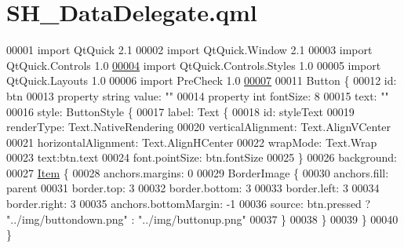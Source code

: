 \hypertarget{SH__DataDelegate_8qml}{\section{S\-H\-\_\-\-Data\-Delegate.\-qml}
\label{SH__DataDelegate_8qml}
}

\begin{DoxyCode}
00001 \textcolor{keyword}{import} QtQuick 2.1
00002 import QtQuick.Window 2.1
00003 import QtQuick.Controls 1.0
\hypertarget{SH__DataDelegate_8qml_source_l00004}{}\hyperlink{classSH__DataDelegate}{00004} import QtQuick.Controls.Styles 1.0
00005 import QtQuick.Layouts 1.0
00006 import PreCheck 1.0
\hypertarget{SH__DataDelegate_8qml_source_l00007}{}\hyperlink{classSH__DataDelegate_acb9da3c73493c88865e08d9575f26482}{00007} 
00011 Button \{
00012     \textcolor{keywordtype}{id}: btn
00013     \textcolor{keyword}{property} \textcolor{keywordtype}{string} value: \textcolor{stringliteral}{""}
00014     \textcolor{keyword}{property} \textcolor{keywordtype}{int} fontSize: 8
00015     text: \textcolor{stringliteral}{""}
00016     style: ButtonStyle \{
00017         label: Text \{
00018             \textcolor{keywordtype}{id}: styleText
00019             renderType: Text.NativeRendering
00020             verticalAlignment: Text.AlignVCenter
00021             horizontalAlignment: Text.AlignHCenter
00022             wrapMode: Text.Wrap
00023             text:btn.text
00024             font.pointSize: btn.fontSize
00025         \}
00026         background:
00027             \hyperlink{classItem}{Item} \{
00028             anchors.margins: 0
00029             BorderImage \{
00030                 anchors.fill: parent
00031                 border.top: 3
00032                 border.bottom: 3
00033                 border.left: 3
00034                 border.right: 3
00035                 anchors.bottomMargin: -1
00036                 source: btn.pressed ? \textcolor{stringliteral}{"../img/buttondown.png"} : \textcolor{stringliteral}{"../img/buttonup.png"}
00037             \}
00038         \}
00039     \}
00040 \}
\end{DoxyCode}
